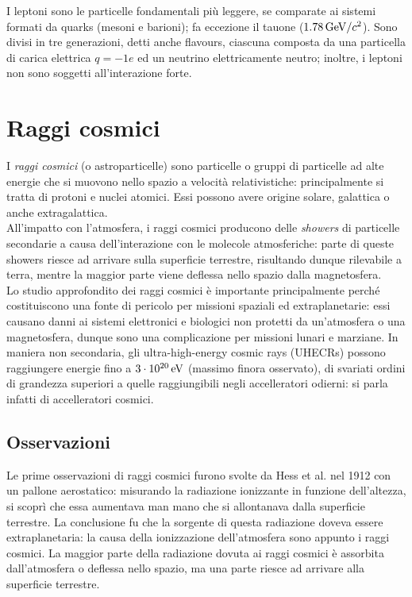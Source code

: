
I leptoni sono le particelle fondamentali più leggere, se comparate ai sistemi formati da quarks (mesoni e barioni); fa eccezione il tauone ($ 1.78\,\mathrm{GeV}/c^2 $). Sono divisi in tre generazioni, detti anche flavours, ciascuna composta da una particella di carica elettrica $ q = -1e $ ed un neutrino elettricamente neutro; inoltre, i leptoni non sono soggetti all'interazione forte.

\section{Raggi cosmici}

I \textit{raggi cosmici} (o astroparticelle) sono particelle o gruppi di particelle ad alte energie che si muovono nello spazio a velocità relativistiche: principalmente si tratta di protoni e nuclei atomici. Essi possono avere origine solare, galattica o anche extragalattica.\\
All'impatto con l'atmosfera, i raggi cosmici producono delle \textit{showers} di particelle secondarie a causa dell'interazione con le molecole atmosferiche: parte di queste showers riesce ad arrivare sulla superficie terrestre, risultando dunque rilevabile a terra, mentre la maggior parte viene deflessa nello spazio dalla magnetosfera.\\
Lo studio approfondito dei raggi cosmici è importante principalmente perché costituiscono una fonte di pericolo per missioni spaziali ed extraplanetarie: essi causano danni ai sistemi elettronici e biologici non protetti da un'atmosfera o una magnetosfera, dunque sono una complicazione  per missioni lunari e marziane. In maniera non secondaria, gli ultra-high-energy cosmic rays (UHECRs) possono raggiungere energie fino a $ 3\cdot10^{20}\,\mathrm{eV} $ (massimo finora osservato), di svariati ordini di grandezza superiori a quelle raggiungibili negli accelleratori odierni: si parla infatti di accelleratori cosmici.

\subsection{Osservazioni}

Le prime osservazioni di raggi cosmici furono svolte da Hess et al. nel 1912 con un pallone aerostatico: misurando la radiazione ionizzante in funzione dell'altezza, si scoprì che essa aumentava man mano che si allontanava dalla superficie terrestre. La conclusione fu che la sorgente di questa radiazione doveva essere extraplanetaria: la causa della ionizzazione dell'atmosfera sono appunto i raggi cosmici. La maggior parte della radiazione dovuta ai raggi cosmici è assorbita dall'atmosfera o deflessa nello spazio, ma una parte riesce ad arrivare alla superficie terrestre.


